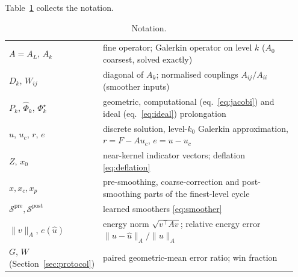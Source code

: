 Table~\ref{tab:notation} collects the notation.
\begin{table}[tbp]\centering\footnotesize
\caption{Notation.}\label{tab:notation}
\begin{tabular}{@{}>{\raggedright\arraybackslash}p{0.27\linewidth}>{\raggedright\arraybackslash}p{0.68\linewidth}@{}}\toprule
$A = A_L$, $A_k$ & fine operator; Galerkin operator on level $k$ ($A_0$ coarsest, solved exactly) \\
$D_k$, $W_{ij}$ & diagonal of $A_k$; normalised couplings $A_{ij}/A_{ii}$ (smoother inputs) \\
$P_k$, $\widehat\Phi_k$, $\Phi_k^\star$ & geometric, computational (eq.~\eqref{eq:jacobi}) and ideal (eq.~\eqref{eq:ideal}) prolongation \\
$u$, $u_c$, $r$, $e$ & discrete solution, level-$k_0$ Galerkin approximation, $r = F - Au_c$, $e = u - u_c$ \\
$Z$, $x_0$ & near-kernel indicator vectors; deflation \eqref{eq:deflation} \\
$x, x_c, x_p$ & pre-smoothing, coarse-correction and post-smoothing parts of the finest-level cycle \\
$\mathcal{S}^{\mathrm{pre}}, \mathcal{S}^{\mathrm{post}}$ & learned smoothers \eqref{eq:smoother} \\
$\|v\|_A$, $e(\hat u)$ & energy norm $\sqrt{v^\top Av}$; relative energy error $\|u - \hat u\|_A/\|u\|_A$ \\
$G$, $W$ (Section~\ref{sec:protocol}) & paired geometric-mean error ratio; win fraction \\
\bottomrule\end{tabular}
\end{table}


